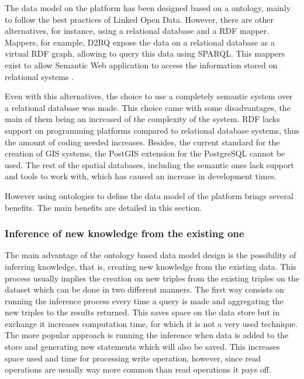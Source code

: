 The data model on the platform has been designed based on a ontology, mainly to follow the best practices of Linked Open Data. However, there are other alternatives, for instance, using a relational database and a RDF mapper. Mappers, for example, D2RQ expose the data on a relational database as a virtual RDF graph, allowing to query this data using SPARQL. This mappers exist to allow Semantic Web application to access the information stored on relational systems \cite{d2rq}.

Even with this alternatives, the choice to use a completely semantic system over a relational database was made. This choice came with some disadvantages, the main of them being an increased of the complexity of the system. RDF lacks support on programming platforms compared to relational database systems, thus the amount of coding needed increases. Besides, the current standard for the creation of GIS systems, the PostGIS \cite{postgis} extension for the PostgreSQL \cite{postgres} cannot be used. The rest of the spatial databases, including the semantic ones lack support and tools to work with, which has caused an increase in development times.

However using ontologies to define the data model of the platform brings several benefits. The main benefits are detailed in this section.

\subsubsection*{Inference of new knowledge from the existing one}

The main advantage of the ontology based data model design is the possibility of inferring knowledge, that is, creating new knowledge from the existing data. This process usually implies the creation on new triples from the existing triples on the dataset which can be done in two different manners. The first way consists on running the inference process every time a query is made and aggregating the new triples to the results returned. This saves space on the data store but in exchange it increases computation time, for which it is not a very used technique. The more popular approach is running the inference when data is added to the store and generating new statements which will also be saved. This increases space used and time for processing write operation, however, since read operations are usually way more common than read operations it pays off.

